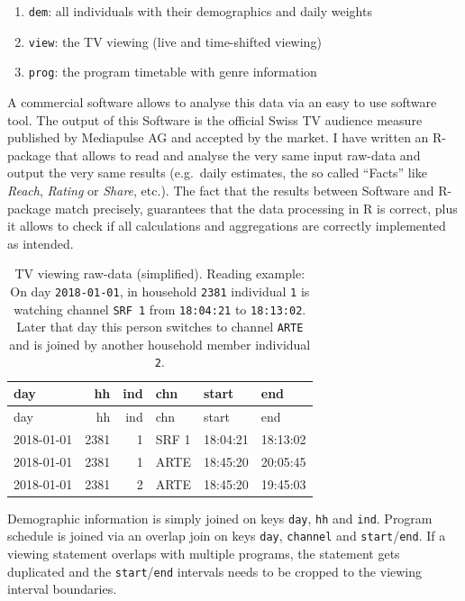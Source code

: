 \documentclass[]{article}
\providecommand{\tightlist}{%
  \setlength{\itemsep}{0pt}\setlength{\parskip}{0pt}}
\begin{document}
\begin{enumerate}
\def\labelenumi{\arabic{enumi}.}
\tightlist
\item
  \texttt{dem}: all individuals with their demographics and daily
  weights
\item
  \texttt{view}: the TV viewing (live and time-shifted viewing)
\item
  \texttt{prog}: the program timetable with genre information
\end{enumerate}

A commercial software allows to analyse this data via an easy to use
software tool. The output of this Software is the official Swiss TV
audience measure published by Mediapulse AG and accepted by the market.
I have written an R-package that allows to read and analyse the very
same input raw-data and output the very same results (e.g.~daily
estimates, the so called ``Facts'' like \emph{Reach}, \emph{Rating} or
\emph{Share}, etc.). The fact that the results between Software and
R-package match precisely, guarantees that the data processing in R is
correct, plus it allows to check if all calculations and aggregations
are correctly implemented as intended.

\begin{longtable}[]{@{}lrrlll@{}}
\caption{\label{tab:tab1}TV viewing raw-data (simplified). Reading
example: On day \texttt{2018-01-01}, in household \texttt{2381}
individual \texttt{1} is watching channel \texttt{SRF\ 1} from
\texttt{18:04:21} to \texttt{18:13:02}. Later that day this person
switches to channel \texttt{ARTE} and is joined by another household
member individual \texttt{2}.}\tabularnewline
\toprule
day & hh & ind & chn & start & end\tabularnewline
\midrule
\endfirsthead
\toprule
day & hh & ind & chn & start & end\tabularnewline
\midrule
\endhead
2018-01-01 & 2381 & 1 & SRF 1 & 18:04:21 & 18:13:02\tabularnewline
2018-01-01 & 2381 & 1 & ARTE & 18:45:20 & 20:05:45\tabularnewline
2018-01-01 & 2381 & 2 & ARTE & 18:45:20 & 19:45:03\tabularnewline
\bottomrule
\end{longtable}

Demographic information is simply joined on keys \texttt{day},
\texttt{hh} and \texttt{ind}. Program schedule is joined via an overlap
join on keys \texttt{day}, \texttt{channel} and
\texttt{start}/\texttt{end}. If a viewing statement overlaps with
multiple programs, the statement gets duplicated and the
\texttt{start}/\texttt{end} intervals needs to be cropped to the viewing
interval boundaries.
\end{document}
